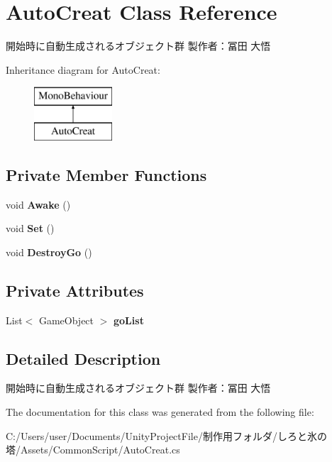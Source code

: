 \hypertarget{class_auto_creat}{}\section{Auto\+Creat Class Reference}
\label{class_auto_creat}


開始時に自動生成されるオブジェクト群 製作者：冨田 大悟  


Inheritance diagram for Auto\+Creat\+:\begin{figure}[H]
\begin{center}
\leavevmode
\includegraphics[height=2.000000cm]{class_auto_creat}
\end{center}
\end{figure}
\subsection*{Private Member Functions}
\begin{DoxyCompactItemize}
\item 
\mbox{\label{class_auto_creat_af4808cd7de5b78d1539bf30dd547f0c5}} 
void {\bfseries Awake} ()
\item 
\mbox{\label{class_auto_creat_a15223f2855bc1b33f0d36d9d776527c5}} 
void {\bfseries Set} ()
\item 
\mbox{\label{class_auto_creat_ad4790fe73787dfa3048687f7c5bdf61e}} 
void {\bfseries Destroy\+Go} ()
\end{DoxyCompactItemize}
\subsection*{Private Attributes}
\begin{DoxyCompactItemize}
\item 
\mbox{\label{class_auto_creat_ae1249839a7e3b9fc9f87773fb49ffd0c}} 
List$<$ Game\+Object $>$ {\bfseries go\+List}
\end{DoxyCompactItemize}


\subsection{Detailed Description}
開始時に自動生成されるオブジェクト群 製作者：冨田 大悟 



The documentation for this class was generated from the following file\+:\begin{DoxyCompactItemize}
\item 
C\+:/\+Users/user/\+Documents/\+Unity\+Project\+File/制作用フォルダ/しろと氷の塔/\+Assets/\+Common\+Script/Auto\+Creat.\+cs\end{DoxyCompactItemize}
